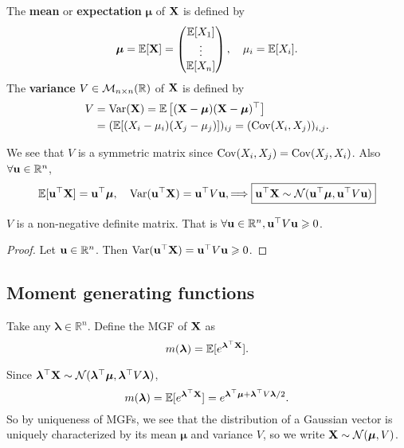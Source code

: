 \begin{definition}
    The \textbf{mean} or \textbf{expectation} $ \boldsymbol{\mu} $ of ${\bf X}$ is defined by 
    \[
        \boldsymbol{\mu} = {\mathbb{E}}[{\bf X}] = \begin{pmatrix}
            {\mathbb{E}}[X_1] \\ \vdots \\ {\mathbb{E}}[X_n]
        \end{pmatrix},\quad \mu_i = {\mathbb{E}}[X_i].
    \]
    The \textbf{variance} $ V\in {\mathcal{M}}_{n \times n}({\mathbb{R}}) $ of $ {\bf X} $ is defined by 
    \begin{align*}
        V &= \operatorname{Var}({\bf X})= {\mathbb{E}}\left[ ({\bf X}-\boldsymbol{\mu})({\bf X}-\boldsymbol{\mu})^\top \right] \\ 
        &= ({\mathbb{E}}[(X_i-\mu_i)(X_j-\mu_j)])_{ij} = (\operatorname{Cov}(X_i,X_j))_{i,j}.
    \end{align*}
\end{definition}
We see that $V$ is a symmetric matrix since $ \operatorname{Cov}(X_i,X_j)=\operatorname{Cov}(X_j,X_i) $. Also $ \forall {\bf u}\in \mathbb{R}^{n} $,
\[
    {\mathbb{E}}[{\bf u}^\top{\bf X}] = {\bf u}^\top \boldsymbol{\mu},\quad \operatorname{Var}({\bf u}^\top {\bf X}) = {\bf u}^\top V {\bf u}, \Longrightarrow \boxed{{\bf u}^\top {\bf X}\sim\mathcal N({\bf u}^\top \boldsymbol{\mu},{\bf u}^\top V{\bf u})}
\]
\begin{proposition}
    $V$ is a non-negative definite matrix. That is $ \forall {\bf u}\in \mathbb{R}^{n}, {\bf u}^\top V{\bf u}\geqslant 0 $.
\end{proposition}
\begin{proof}
    Let ${\bf u}\in \mathbb{R}^{n}$. Then $ \operatorname{Var}({\bf u}^\top {\bf X})={\bf u}^\top V{\bf u}\geqslant 0 $.
\end{proof}
\subsection{Moment generating functions}
\begin{definition}
    Take any $ \boldsymbol{\lambda}\in \mathbb{R}^{n} $. Define the MGF of ${\bf X}$ as
    \[
        m(\boldsymbol{\lambda}) = {\mathbb{E}}[ e^{\boldsymbol{\lambda}^\top {\bf X}} ].
    \]
\end{definition}

Since $ \boldsymbol{\lambda}^\top {\bf X} \sim {\mathcal{N}}(\boldsymbol{\lambda}^\top \boldsymbol{\mu}, \boldsymbol{\lambda}^\top V \boldsymbol{\lambda}) $,
\[
    m(\boldsymbol{\lambda}) = {\mathbb{E}}[ e^{\boldsymbol{\lambda}^\top {\bf X}} ]= e^{\boldsymbol{\lambda}^\top \boldsymbol{\mu}+ \boldsymbol{\lambda}^\top V \boldsymbol{\lambda}/2}.
\]
So by uniqueness of MGFs, we see that the distribution of a Gaussian vector is uniquely characterized by its mean $\boldsymbol{\mu}$ and variance $V$, so we write ${\bf X}\sim\mathcal N(\boldsymbol{\mu},V)$.

